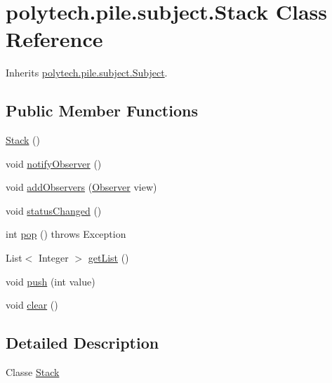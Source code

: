 \hypertarget{classpolytech_1_1pile_1_1subject_1_1_stack}{}\section{polytech.\+pile.\+subject.\+Stack Class Reference}
\label{classpolytech_1_1pile_1_1subject_1_1_stack}


Inherits \hyperlink{interfacepolytech_1_1pile_1_1subject_1_1_subject}{polytech.\+pile.\+subject.\+Subject}.

\subsection*{Public Member Functions}
\begin{DoxyCompactItemize}
\item 
\hyperlink{classpolytech_1_1pile_1_1subject_1_1_stack_a65d85fe80877b26c71f44b30cba1692a}{Stack} ()
\item 
void \hyperlink{classpolytech_1_1pile_1_1subject_1_1_stack_a370de235d9d913914a2c46035f9b9465}{notify\+Observer} ()
\item 
void \hyperlink{classpolytech_1_1pile_1_1subject_1_1_stack_a705c6023868cbd440d87b04cfe7cbd85}{add\+Observers} (\hyperlink{interfacepolytech_1_1pile_1_1observers_1_1_observer}{Observer} view)
\item 
void \hyperlink{classpolytech_1_1pile_1_1subject_1_1_stack_a350f674a71cae9fce7eca5488af074e5}{status\+Changed} ()
\item 
int \hyperlink{classpolytech_1_1pile_1_1subject_1_1_stack_a88c36e3ec222b68a6e54739eb4e81f0e}{pop} ()  throws Exception 
\item 
List$<$ Integer $>$ \hyperlink{classpolytech_1_1pile_1_1subject_1_1_stack_afc9fff3b1d8f384029611fdf16dd09b0}{get\+List} ()
\item 
void \hyperlink{classpolytech_1_1pile_1_1subject_1_1_stack_adb4397a6a951ba4fcfb3040706773a86}{push} (int value)
\item 
void \hyperlink{classpolytech_1_1pile_1_1subject_1_1_stack_a6858b0948d676f466fd6f07f9bf0b8cb}{clear} ()
\end{DoxyCompactItemize}


\subsection{Detailed Description}
Classe \hyperlink{classpolytech_1_1pile_1_1subject_1_1_stack}{Stack}

